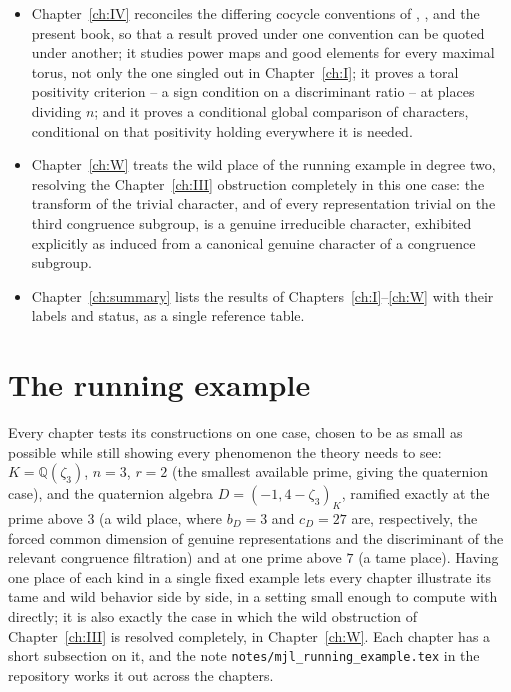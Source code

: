 \documentclass[11pt,oneside]{book}
\theoremstyle{plain}
\theoremstyle{definition}
\begin{document}
\begin{itemize}[leftmargin=*]
studies the division-algebra side through a unitary transform $L_D$ of class functions, modeled on the classical character transform between $\mathrm{GL}(r)$ and $D^\times$; it
proves that $L_D$ carries irreducible characters to irreducible genuine characters at places not
dividing $n$ (the \emph{tame} places), obtains the character relation there in the range of the
corrected Flicker--Kazhdan correspondence, and gives the obstruction -- a common factor forced on every genuine irreducible dimension -- at
places dividing $n$ (the \emph{wild} places), where the same argument breaks down.
\item Chapter~\ref{ch:IV} reconciles the differing cocycle conventions of \cite{FK86}, \cite{Z23}, and the present book, so that a result proved under one convention can be quoted under another; it
studies power maps and good elements for every maximal torus, not only the one singled out in Chapter~\ref{ch:I}; it
proves a toral positivity criterion -- a sign condition on a discriminant ratio -- at
places dividing $n$; and it
proves a conditional global comparison of characters, conditional on that positivity holding everywhere it is needed.
\item Chapter~\ref{ch:W} treats the wild place of the running example in degree two, resolving the Chapter~\ref{ch:III} obstruction completely in this one case: the transform of the trivial character, and of every representation trivial on the third congruence subgroup, is a genuine irreducible character, exhibited explicitly as induced from a canonical genuine character of a congruence subgroup.
\item Chapter~\ref{ch:summary} lists the results of
Chapters~\ref{ch:I}--\ref{ch:W} with their labels and status, as a single reference table.
\end{itemize}

\section{The running example}
Every chapter tests its constructions on one case, chosen to be as small as possible while still showing every phenomenon the theory needs to see: $K=\mathbb Q(\zeta_3)$,
$n=3$, $r=2$ (the smallest available prime, giving the quaternion case), and the quaternion algebra $D=(-1,4-\zeta_3)_K$, ramified
exactly at the prime above $3$ (a wild place, where $b_D=3$ and
$c_D=27$ are, respectively, the forced common dimension of genuine representations and the discriminant of the relevant congruence filtration) and at one prime above $7$ (a tame place).  Having one place of each kind in a single fixed example lets every chapter illustrate its tame and wild behavior side by side, in a setting small enough to compute with directly; it is also exactly the case in which the wild obstruction of Chapter~\ref{ch:III} is resolved completely, in Chapter~\ref{ch:W}. Each chapter has a
short subsection on it, and the note
\texttt{notes/mjl\_running\_example.tex} in the repository works it out
across the chapters.
\end{document}
